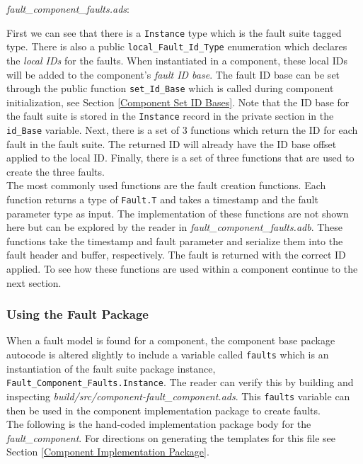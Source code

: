 \textit{fault\_component\_faults.ads}:

First we can see that there is a \texttt{Instance} type which is the fault suite tagged type. There is also a public \texttt{local\_Fault\_Id\_Type} enumeration which declares the \textit{local IDs} for the faults. When instantiated in a component, these local IDs will be added to the component's \textit{fault ID base}. The fault ID base can be set through the public function \texttt{set\_Id\_Base} which is called during component initialization, see Section \ref{Component Set ID Bases}. Note that the ID base for the fault suite is stored in the \texttt{Instance} record in the private section in the \texttt{id\_Base} variable. Next, there is a set of 3 functions which return the ID for each fault in the fault suite. The returned ID will already have the ID base offset applied to the local ID. Finally, there is a set of three functions that are used to create the three faults. \\

The most commonly used functions are the fault creation functions. Each function returns a type of \texttt{Fault.T} and takes a timestamp and the fault parameter type as input. The implementation of these functions are not shown here but can be explored by the reader in \textit{fault\_component\_faults.adb}. These functions take the timestamp and fault parameter and serialize them into the fault header and buffer, respectively. The fault is returned with the correct ID applied. To see how these functions are used within a component continue to the next section.

\subsubsection{Using the Fault Package}

When a fault model is found for a component, the component base package autocode is altered slightly to include a variable called \texttt{faults} which is an instantiation of the fault suite package instance, \texttt{Fault\_Component\_Faults.Instance}. The reader can verify this by building and inspecting \textit{build/src/component-fault\_component.ads}. This \texttt{faults} variable can then be used in the component implementation package to create faults. \\

The following is the hand-coded implementation package body for the \textit{fault\_component}. For directions on generating the templates for this file see Section \ref{Component Implementation Package}. \\

